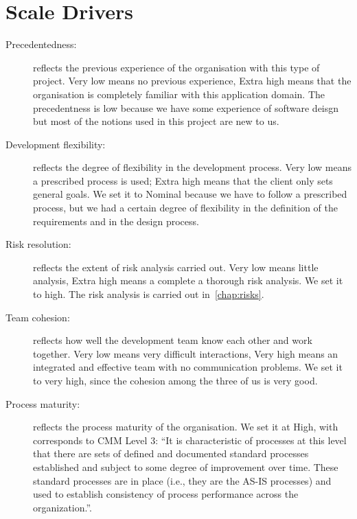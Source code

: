 \section{Scale Drivers}

\begin{description}

    \item[Precedentedness:] reflects the previous experience of the organisation with this type of project. Very low means no previous experience, Extra high means that the organisation is completely familiar with this application domain.
    The precedentness is low because we have some experience of software deisgn but most of the notions used in this project are new to us.

    \item[Development flexibility:] reflects the degree of flexibility in the development process. Very low means a prescribed process is used; Extra high means that the client only sets general goals. We set it to Nominal because we have to follow a prescribed process, but we had a certain degree of flexibility in the definition of the requirements and in the design process.

    \item[Risk resolution:] reflects the extent of risk analysis carried out. Very low means little analysis, Extra high means a complete a thorough risk analysis. We set it to high. The risk analysis is carried out in~\autoref{chap:risks}.

    \item[Team cohesion:] reflects how well the development team know each other and work together. Very low means very difficult interactions, Very high means an integrated and effective team with no communication problems. We set it to very high, since the cohesion among the three of us is very good.

    \item[Process maturity:] reflects the process maturity of the organisation. We set it at High, with corresponds to CMM Level 3: ``It is characteristic of processes at this level that there are sets of defined and documented standard processes established and subject to some degree of improvement over time. These standard processes are in place (i.e., they are the AS-IS processes) and used to establish consistency of process performance across the organization.''.

\end{description}

